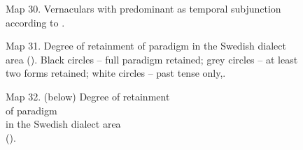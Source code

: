


\begin{figure}[h]

\begin{minipage}{5.19792in}

\label{bkm:Ref264373686}Map 30. Vernaculars with predominant as temporal subjunction\\
 according to \citet{Vallmark1937}.


\end{minipage}

\end{figure}



\begin{figure}[h]

\begin{minipage}{5.875in}

Map 31. Degree of retainment of paradigm in the Swedish dialect area (\citet{Markey1969}). Black circles – full paradigm retained; grey circles – at least two forms retained; white circles – past tense only,. 


\end{minipage}

\end{figure}

\begin{figure}[h]

\begin{minipage}{3.62986in}

\label{bkm:Ref224104985}Map 32. (below) Degree of retainment\\
of paradigm\\
in the Swedish dialect area\\
(\citet{Markey1969}).


\end{minipage}

\end{figure}

